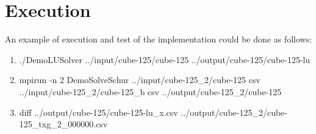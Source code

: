 \documentclass[a4paper,12pt,oneside]{article}
\begin{document}
\newpage
\section{Execution}

An example of execution and test of the implementation could be done as follows:

\begin{enumerate}
\item
./DemoLUSolver ../input/cube-125/cube-125 ../output/cube-125/cube-125-lu
\\
\item
mpirun -n 2 DemoSolveSchur ../input/cube-125{\_}2/cube-125 csv ../input/cube-125{\_}2/cube-125{\_}b csv ../output/cube-125{\_}2/cube-125
\\
\item
diff ../output/cube-125/cube-125-lu{\_}x.csv ../output/cube-125{\_}2/cube-125{\_}txg{\_}2{\_}000000.csv
\end{enumerate}
\end{document}
